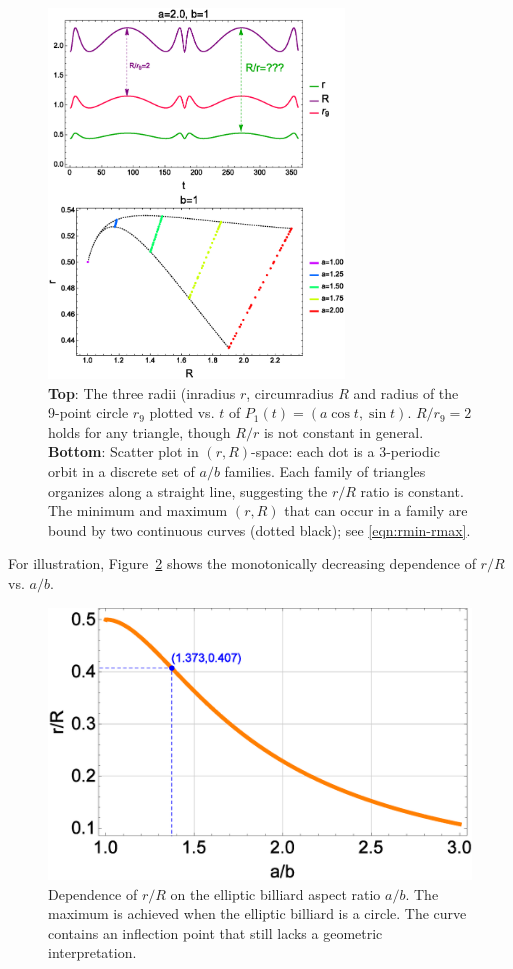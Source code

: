 \documentclass{article}
\theoremstyle{definition}
\begin{document}
\begin{figure}[H]
    \centering
    \includegraphics[width=0.70\textwidth]{1050_radii_grid2.eps}
    \caption{\textbf{Top}: The three radii (inradius $r$, circumradius $R$ and radius of the 9-point circle $r_9$ plotted vs. $t$ of $P_1(t)=(a \cos t,\sin t)$. $R/r_9=2$ holds for any triangle, though $R/r$ is not constant in general. \textbf{Bottom}: Scatter plot in $(r,R)$-space: each dot is a 3-periodic orbit in a discrete set of $a/b$ families. Each family of triangles organizes along a straight line, suggesting the $r/R$ ratio is constant. The minimum and maximum $(r,R)$ that can occur in a family are bound by two continuous curves (dotted black); see \eqref{eqn:rmin-rmax}.}
    \label{fig:radii-grid2}
\end{figure}

For illustration, Figure~\ref{fig:rovR-vs-ab} shows the monotonically decreasing dependence of $r/R$ vs. $a/b$.

\begin{figure}[H]
    \centering
    \includegraphics[width=.60\textwidth]{1030_rR_vs_ab.eps}
    \caption{Dependence of $r/R$ on the elliptic billiard aspect ratio $a/b$. The maximum is achieved when the elliptic billiard is a circle. The curve contains an inflection point that still lacks a geometric interpretation.}
    \label{fig:rovR-vs-ab}
\end{figure}
\end{document}
